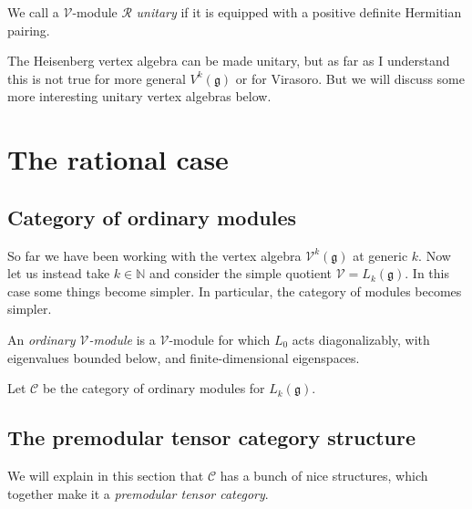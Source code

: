 \documentclass[12pt,letterpaper,reqno]{amsart}
\numberwithin{equation}{section}
\newcommand{\fg}{{\mathfrak g}}
\newcommand{\cC}{\ensuremath{\mathcal C}}
\newcommand{\bbN}{{\mathbb N}}
\newcommand{\vertex}{\mathcal{V}}
\newcommand{\vrep}{\mathcal{R}}
\newcommand{\ti}[1]{\textit{#1}}
\begin{document}
\begin{defn}[Unitarity]
We call a $\vertex$-module $\vrep$ \ti{unitary} if it is
equipped with a positive definite Hermitian pairing.
\end{defn}

The Heisenberg vertex algebra can be made unitary,
but as far as I understand this is not true for
more general $V^k(\fg)$ or for Virasoro.
But we will discuss some more interesting 
unitary vertex algebras below.




\section{The rational case}

\subsection{Category of ordinary modules}

So far we have been working with the vertex algebra $\vertex^k(\fg)$ at generic $k$.
Now let us instead take $k \in \bbN$ and 
consider the simple quotient $\vertex = L_k(\fg)$.
In this case some things become simpler.
In particular, the category of modules becomes simpler.

\begin{defn}
An \ti{ordinary $\vertex$-module} is a $\vertex$-module for which 
$L_0$ acts diagonalizably, with eigenvalues bounded below, and
finite-dimensional eigenspaces.
\end{defn}

Let $\cC$ be the category of ordinary modules for $L_k(\fg)$.


\subsection{The premodular tensor category structure}

We will explain in this section that $\cC$ has a bunch of nice 
structures, which together make it a \ti{premodular tensor
category}.
\end{document}
